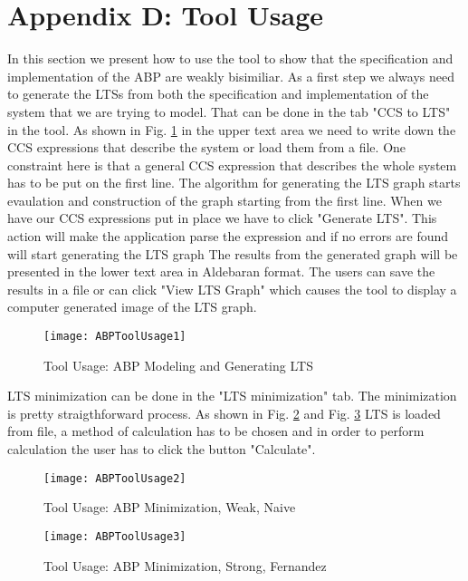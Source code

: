 \section*{Appendix D: Tool Usage}
\label{appendixD}

In this section we present how to use the tool to show that the specification and 
implementation of the ABP are weakly bisimiliar. As a first step we always need to
generate the LTSs from both the specification and implementation of the system that
we are trying to model. That can be done in the tab "CCS to LTS" in the tool. As shown
in Fig. \ref{fig:abptoolusage1} in the upper text area we need to write down the CCS 
expressions that describe the system or load them from a file. One constraint here
is that a general CCS expression that describes the whole system has to be put on
the first line. The algorithm for generating the LTS graph starts evaulation and 
construction of the graph starting from the first line. When we have our CCS expressions
put in place we have to click "Generate LTS". This action will make the application
parse the expression and if no errors are found will start generating the LTS graph
The results from the generated graph will be presented in the lower text area in 
Aldebaran format. The users can save the results in a file or can click "View LTS Graph" 
which causes the tool to display a computer generated image of the LTS graph.

\begin{figure}[h]
\centering
\texttt{[image: ABPToolUsage1]}
\caption{Tool Usage: ABP Modeling and Generating LTS}
\label{fig:abptoolusage1}
\end{figure}

LTS minimization can be done in the "LTS minimization" tab. The minimization is pretty 
straigthforward process. As shown in Fig. \ref{fig:abptoolusage2} and Fig. \ref{fig:abptoolusage3}
LTS is loaded from file, a method of calculation has to be chosen and in order to perform
calculation the user has to click the button "Calculate".

\begin{figure}[h]
\centering
\texttt{[image: ABPToolUsage2]}
\caption{Tool Usage: ABP Minimization, Weak, Naive}
\label{fig:abptoolusage2}
\end{figure}

\begin{figure}[h]
\centering
\texttt{[image: ABPToolUsage3]}
\caption{Tool Usage: ABP Minimization, Strong, Fernandez}
\label{fig:abptoolusage3}
\end{figure}

